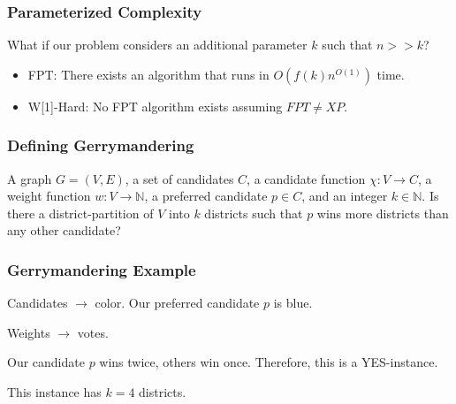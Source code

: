 
\begin{frame}[t]
	\frametitle{Parameterized Complexity}
	What if our problem considers an additional parameter $k$ such that $n >> k$?
	\vspace{1.0cm}
	\begin{itemize}
		\item FPT: There exists an algorithm that runs in $O(f(k)n^{O(1)})$ time.
		\vspace{1.0cm}
		\item W[1]-Hard: No FPT algorithm exists assuming $FPT \neq XP$.
	\end{itemize}
\end{frame}

\begin{frame}[t]
	\frametitle{Defining Gerrymandering}
	\small
	{A graph $G = (V,E)$, a set of candidates $C$, a candidate function $\chi: V \rightarrow C$, a weight function $w: V \rightarrow \mathbb{N}$, a preferred candidate $p \in C$, and an integer $k \in \mathbb{N}$.}
	{Is there a district-partition of $V$ into $k$ districts such that $p$ wins more districts than any other candidate?}

	 {
			\begin{figure}
				\begin{center}
					
				\end{center}
			\end{figure}
	}
\end{frame}

\begin{frame}[t]
	\frametitle{Gerrymandering Example}
	\begin{figure}
		\begin{center}
			
		\end{center}
	\end{figure}

	\begin{itemize}
		\item Candidates $\rightarrow$ color. Our preferred candidate $p$ is blue.
		\item Weights $\rightarrow$ votes.
		\onslide<3> {
			\item Our candidate $p$ wins twice, others win once. Therefore, this is a YES-instance.
			\item This instance has $k=4$ districts.
		}
	\end{itemize}
\end{frame}